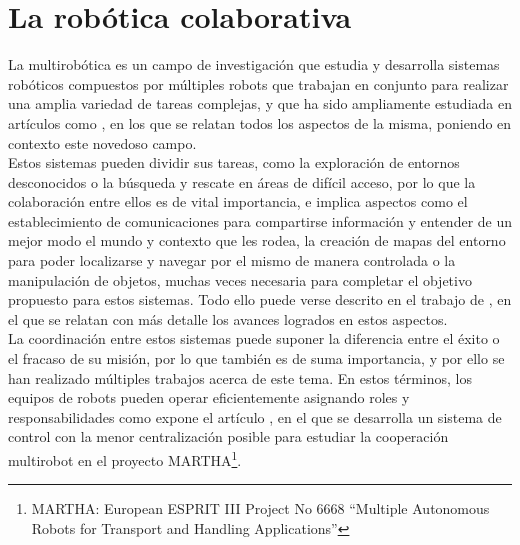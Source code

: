 \section{La robótica colaborativa}
\label{sec:robotica_colaborativa} %


La multirobótica es un campo de investigación que estudia y desarrolla sistemas
robóticos compuestos por múltiples robots que trabajan en conjunto para realizar
una amplia variedad de tareas complejas, y que ha sido ampliamente estudiada en
artículos como \cite{Verma2021}, en los que se relatan todos los aspectos de la
misma, poniendo en contexto este novedoso campo.
\\

Estos sistemas pueden dividir sus tareas, como la exploración de entornos
desconocidos o la búsqueda y rescate en áreas de difícil acceso, por lo que la
colaboración entre ellos es de vital importancia, e implica aspectos como el
establecimiento de comunicaciones para compartirse información y entender de un
mejor modo el mundo y contexto que les rodea, la creación de mapas del entorno
para poder localizarse y navegar por el mismo de manera controlada o la
manipulación de objetos, muchas veces necesaria para completar el objetivo
propuesto para estos sistemas.
Todo ello puede verse descrito en el trabajo de \cite{Parker2003}, en el que se
relatan con más detalle los avances logrados en estos aspectos.
\\

La coordinación entre estos sistemas puede suponer la diferencia entre el éxito
o el fracaso de su misión, por lo que también es de suma importancia, y por ello
se han realizado múltiples trabajos acerca de este tema.
En estos términos, los equipos de robots pueden operar eficientemente asignando
roles y responsabilidades como expone el artículo \cite{Alami1998}, en el que se
desarrolla un sistema de control con la menor centralización posible para
estudiar la cooperación multirobot en el proyecto
MARTHA\footnote{MARTHA: European ESPRIT III Project No 6668 ``Multiple
Autonomous Robots for Transport and Handling Applications''}.
\\

